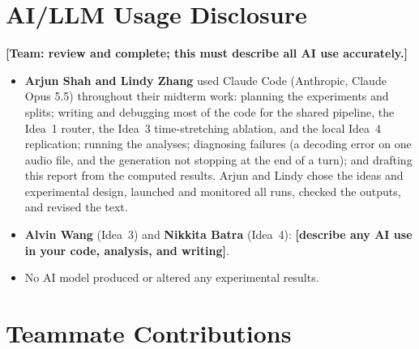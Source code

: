 \documentclass{article}
\begin{document}



\clearpage
\appendix

\section{AI/LLM Usage Disclosure}

\textbf{[Team: review and complete; this must describe all AI use accurately.]}

\begin{itemize}
  \item \textbf{Arjun Shah and Lindy Zhang} used Claude Code (Anthropic, Claude Opus
    5.5) throughout their midterm work: planning the experiments and splits; writing
    and debugging most of the code for the shared pipeline, the Idea~1 router, the
    Idea~3 time-stretching ablation, and the local Idea~4 replication; running the
    analyses; diagnosing failures (a decoding error on one audio file, and the
    generation not stopping at the end of a turn); and drafting this report from the
    computed results. Arjun and Lindy chose the ideas and experimental design,
    launched and monitored all runs, checked the outputs, and revised the text.
  \item \textbf{Alvin Wang} (Idea~3) and \textbf{Nikkita Batra} (Idea~4):
    \textbf{[describe any AI use in your code, analysis, and writing]}.
  \item No AI model produced or altered any experimental results.
\end{itemize}

\section{Teammate Contributions}
\end{document}
